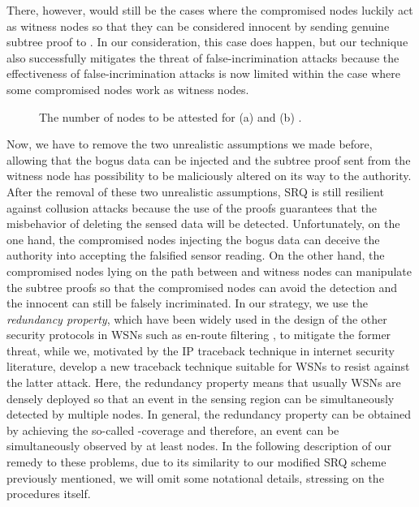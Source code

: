 \documentclass[conference]{IEEEtran}
\begin{document}
There, however, would still be the cases where the compromised nodes luckily act as witness nodes so that they can be considered innocent by sending genuine subtree proof to . In our consideration, this case does happen, but our technique also successfully mitigates the threat of false-incrimination attacks because the effectiveness of false-incrimination attacks is now limited within the case where some compromised nodes work as witness nodes.

\begin{figure}[h]
\centering
{}
\caption{\scriptsize The number of nodes to be attested for (a)  and (b) .} \label{fig: number of nodes to be attested}
\end{figure}

Now, we have to remove the two unrealistic assumptions we made before, allowing that the bogus data can be injected and the subtree proof sent from the witness node has possibility to be maliciously altered on its way to the authority. After the removal of these two unrealistic assumptions, SRQ is still resilient against collusion attacks because the use of the proofs guarantees that the misbehavior of deleting the sensed data will be detected. Unfortunately, on the one hand, the compromised nodes injecting the bogus data can deceive the authority into accepting the falsified sensor reading. On the other hand, the compromised nodes lying on the path between  and witness nodes can manipulate the subtree proofs so that the compromised nodes can avoid the detection and the innocent  can still be falsely incriminated. In our strategy, we use the \emph{redundancy property}, which have been widely used in the design of the other security protocols in WSNs such as en-route filtering \cite{yg06,yl09,yllz04,zsjn04}, to mitigate the former threat, while we, motivated by the IP traceback technique in internet security literature, develop a new traceback technique suitable for WSNs to resist against the latter attack. Here, the redundancy property means that usually WSNs are densely deployed so that an event in the sensing region can be simultaneously detected by multiple nodes. In general, the redundancy property can be obtained by achieving the so-called -coverage \cite{ht05,mkps01,wxzlpg03} and therefore, an event can be simultaneously observed by at least  nodes. In the following description of our remedy to these problems, due to its similarity to our modified SRQ scheme previously mentioned, we will omit some notational details, stressing on the procedures itself.
\end{document}
